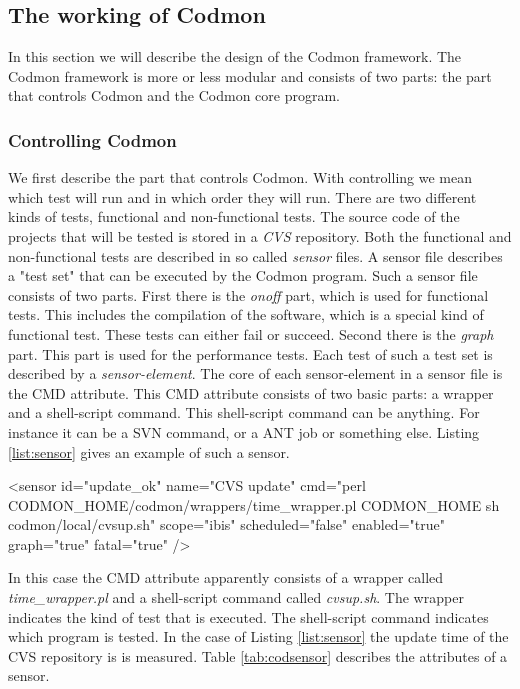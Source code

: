 \documentclass{article}
\begin{document}
\subsection{The working of Codmon}
\label{subsec:CodmonDesign}
In this section we will describe the design of the Codmon framework. The Codmon framework is more or less modular and consists of two parts: the part that controls Codmon and the Codmon core program.\\

\subsubsection{Controlling Codmon}
\label{control}
\noindent We first describe the part that controls Codmon. With controlling we mean which test will run and in which order they will run. There are two different kinds of tests, functional and non-functional 
tests. The source code of the projects that will be tested is stored in a \emph{CVS} repository. Both the functional and non-functional tests are described in so called \emph{sensor} files. A sensor file 
describes a "test set" that can be executed by the Codmon program. Such a sensor file consists of two parts. First there is the \emph{onoff} part, which is used for functional tests. This includes the compilation 
of the software, which is a special kind of functional test. These tests can either fail or succeed. Second there is the \emph{graph} part. This part is used for the performance tests. Each test of such a test 
set is described by a \emph{sensor-element}. The core of each sensor-element in a sensor file is the CMD attribute. This CMD attribute consists of two basic parts: a wrapper and a shell-script command. 
This shell-script command can be anything. For instance it can be a SVN command, or a ANT job or something else. Listing \ref{list:sensor} gives an example of such a sensor.\\


\begin{code}[frame=shadowbox, language=XML,showstringspaces=false]
 <sensor id="update_ok" 
    name="CVS update" 
    cmd="perl CODMON_HOME/codmon/wrappers/time_wrapper.pl CODMON_HOME sh codmon/local/cvsup.sh" 
    scope="ibis" 
    scheduled="false"
    enabled="true"
    graph="true" 
    fatal="true" />
\end{code}

\noindent In this case the CMD attribute apparently consists of a wrapper called \emph{time\_wrapper.pl} and a shell-script command called \emph{cvsup.sh}. The wrapper indicates the kind of test
that is executed. The shell-script command indicates which program is tested. In the case of Listing \ref{list:sensor} the update time of the CVS repository is is measured. Table \ref{tab:codsensor} describes
the attributes of a sensor\cite{Codmon}.\\
\end{document}
